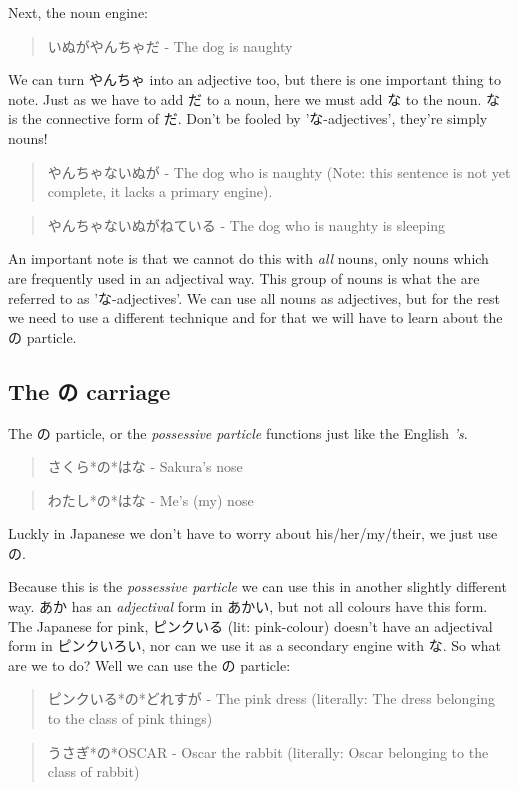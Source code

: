 \documentclass[11pt]{article}
\begin{document}
Next, the noun engine:
\begin{quote}
いぬがやんちゃだ - The dog is naughty
\end{quote}
We can turn やんちゃ into an adjective too, but there is one important thing to note. Just as we have to add だ to a noun, here we must add な to the noun. な is the connective form of だ. Don't be fooled by 'な-adjectives', they're simply nouns!
\begin{quote}
やんちゃないぬが - The dog who is naughty (Note: this sentence is not yet complete, it lacks a primary engine).
\end{quote}
\begin{quote}
やんちゃないぬがねている - The dog who is naughty is sleeping
\end{quote}

An important note is that we cannot do this with \emph{all} nouns, only nouns which are frequently used in an adjectival way. This group of nouns is what the are referred to as 'な-adjectives'. We can use all nouns as adjectives, but for the rest we need to use a different technique and for that we will have to learn about the の particle.

\subsection{The の carriage}
\label{sec:orgaab2c1d}
The の particle, or the \emph{possessive particle} functions just like the English \emph{'s}.
\begin{quote}
さくら*の*はな - Sakura's nose
\end{quote}
\begin{quote}
わたし*の*はな - Me's (my) nose
\end{quote}
Luckly in Japanese we don't have to worry about his/her/my/their, we just use の.

Because this is the \emph{possessive particle} we can use this in another slightly different way. あか has an \emph{adjectival} form in あかい, but not all colours have this form. The Japanese for pink, ピンクいる (lit: pink-colour) doesn't have an adjectival form in ピンクいろい, nor can we use it as a secondary engine with な. So what are we to do? Well we can use the の particle:
\begin{quote}
ピンクいる*の*どれすが - The pink dress (literally: The dress belonging to the class of pink things)
\end{quote}
\begin{quote}
うさぎ*の*OSCAR - Oscar the rabbit (literally: Oscar belonging to the class of rabbit)
\end{quote}
\end{document}
